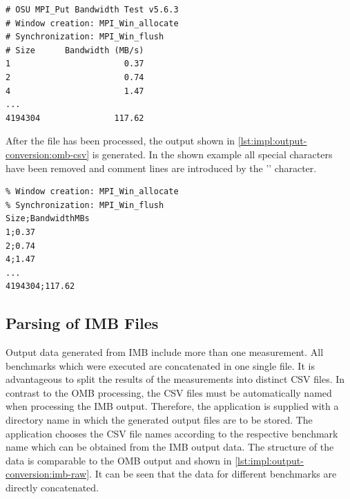 \begin{lstlisting}[style=console,captionpos={b},caption={Generated raw output of a \acs{OMB} run.},label=lst:impl:output-conversion:omb-raw]
# OSU MPI_Put Bandwidth Test v5.6.3
# Window creation: MPI_Win_allocate
# Synchronization: MPI_Win_flush
# Size      Bandwidth (MB/s)
1                       0.37
2                       0.74
4                       1.47
...
4194304               117.62
\end{lstlisting}

After the file has been processed, the output shown in \autoref{lst:impl:output-conversion:omb-csv} is generated. In the shown example all special characters have been removed and comment lines are introduced by the '\code{\%}' character.

\begin{lstlisting}[style=console,captionpos={b},caption={Processed \acs{OMB} output with replacement of the comment character with '\code{\%}' and removal of all special characters.},label=lst:impl:output-conversion:omb-csv]
% OSU MPI_Put Bandwidth Test v5.6.3
% Window creation: MPI_Win_allocate
% Synchronization: MPI_Win_flush
Size;BandwidthMBs
1;0.37
2;0.74
4;1.47
...
4194304;117.62
\end{lstlisting}



\subsection{Parsing of \acs{IMB} Files}

Output data generated from \ac{IMB} include more than one measurement. All benchmarks which were executed are concatenated in one single file. It is advantageous to split the results of the measurements into distinct \acs{CSV} files. In contrast to the \ac{OMB} processing, the \acs{CSV} files must be automatically named when processing the \ac{IMB} output. Therefore, the application is supplied with a directory name in which the generated output files are to be stored. The application chooses the \acs{CSV} file names according to the respective benchmark name which can be obtained from the \ac{IMB} output data. The structure of the data is comparable to the \ac{OMB} output and shown in \autoref{lst:impl:output-conversion:imb-raw}. It can be seen that the data for different benchmarks are directly concatenated. 

